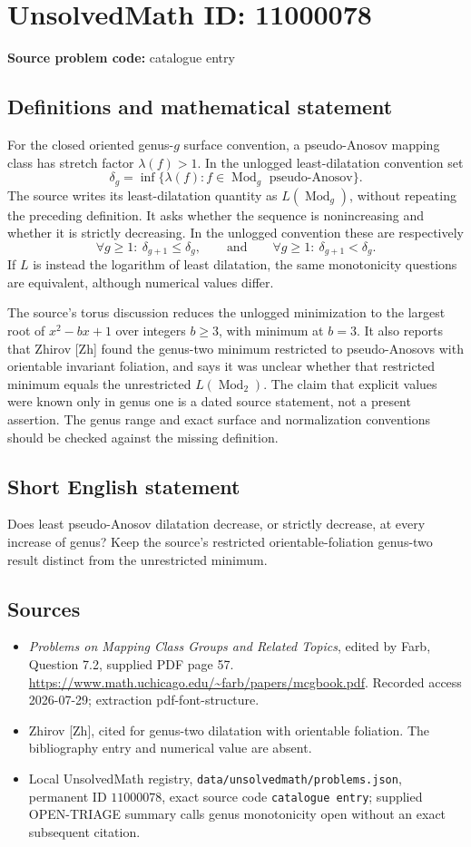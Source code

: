 \documentclass[11pt]{article}
\begin{document}
\section*{UnsolvedMath ID: 11000078}
\textbf{Source problem code:} catalogue entry
\subsection{Definitions and mathematical statement}
For the closed oriented genus-\(g\) surface convention, a pseudo-Anosov mapping class has stretch factor \(\lambda(f)>1\). In the unlogged least-dilatation convention set
\[
 \delta_g=\inf\{\lambda(f):f\in\operatorname{Mod}_g
                       \text{ pseudo-Anosov}\}.
\]
The source writes its least-dilatation quantity as \(L(\operatorname{Mod}_g)\), without repeating the preceding definition. It asks whether the sequence is nonincreasing and whether it is strictly decreasing. In the unlogged convention these are respectively
\[
 \forall g\geq1:\ \delta_{g+1}\leq\delta_g,
 \qquad\text{and}\qquad
 \forall g\geq1:\ \delta_{g+1}<\delta_g.
\]
If \(L\) is instead the logarithm of least dilatation, the same monotonicity questions are equivalent, although numerical values differ.

The source's torus discussion reduces the unlogged minimization to the largest root of \(x^2-bx+1\) over integers \(b\geq3\), with minimum at \(b=3\). It also reports that Zhirov [Zh] found the genus-two minimum restricted to pseudo-Anosovs with orientable invariant foliation, and says it was unclear whether that restricted minimum equals the unrestricted \(L(\operatorname{Mod}_2)\). The claim that explicit values were known only in genus one is a dated source statement, not a present assertion. The genus range and exact surface and normalization conventions should be checked against the missing definition.
\subsection{Short English statement}
Does least pseudo-Anosov dilatation decrease, or strictly decrease, at every increase of genus? Keep the source's restricted orientable-foliation genus-two result distinct from the unrestricted minimum.
\subsection{Sources}
\begin{itemize}
\item \emph{Problems on Mapping Class Groups and Related Topics}, edited by Farb, Question 7.2, supplied PDF page 57. \url{https://www.math.uchicago.edu/~farb/papers/mcgbook.pdf}. Recorded access 2026-07-29; extraction pdf-font-structure.
\item Zhirov [Zh], cited for genus-two dilatation with orientable foliation. The bibliography entry and numerical value are absent.
\item Local UnsolvedMath registry, \texttt{data/unsolvedmath/problems.json}, permanent ID \(11000078\), exact source code \texttt{catalogue entry}; supplied OPEN-TRIAGE summary calls genus monotonicity open without an exact subsequent citation.
\end{itemize}
\end{document}
